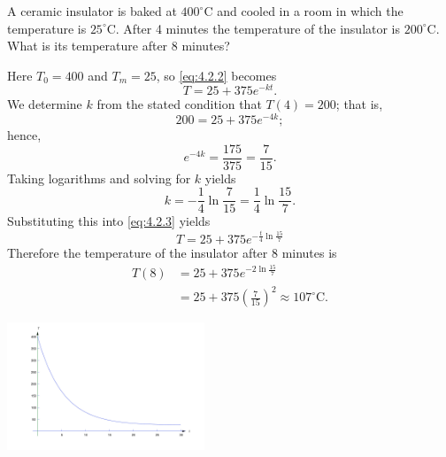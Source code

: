 \documentclass{ximera}
\begin{document}
\begin{example}\label{example:4.2.1}
A ceramic insulator is baked at $400^\circ$C and cooled in a room in
which the temperature is $25^\circ$C. After 4 minutes the
temperature of the insulator is $200^\circ$C. What is its temperature
after 8 minutes?
\begin{explanation} Here $T_0=400$ and $T_m=25$, so \eqref{eq:4.2.2} becomes
\begin{equation} \label{eq:4.2.3}
T=25+375e^{-kt}.
\end{equation}
 We determine $k$ from the stated condition that  $T(4)=200$;
that is,
$$
200=25+375e^{-4k};
$$
 hence,
$$
e^{-4k} = \frac{175}{375} = \frac{7}{15}.
$$
 Taking logarithms and solving for $k$ yields
$$
k=-\frac{1}{4} \ln \frac{7}{15}=\frac{1}{4}\ln \frac{15}{7}.
$$
 Substituting this into \eqref{eq:4.2.3} yields
$$
T=25+375 e^{-\frac{t}{4} \ln \frac{15}{7}}
$$
Therefore the temperature of the insulator after
8 minutes is
$$\begin{array}{rl}
T(8) & = 25+375 e^{-2 \ln \frac{15}{7}} \\
& = 25+375 \left(\frac{7}{15}\right)^2 \approx
107^\circ \mbox{C}.
\end{array}$$

\begin{image}
  \includegraphics[height=1.5in]{fig040201.jpg} \end{image}
\end{explanation}
\end{example}
\end{document}
